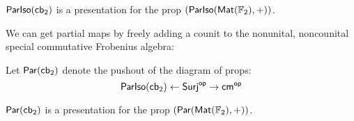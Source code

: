 \begin{remark}


\end{remark}


\begin{lemma}
\label{lem:parisocb}
$\mathsf{Par}{\sf Iso}({\sf cb}_2)$ is a presentation for the prop $(\mathsf{Par}{\sf Iso}(\mathsf{Mat}(\mathbb{F}_2),+))$.
\end{lemma}


We can get partial maps by freely adding a counit to the nonunital, noncounital special commutative Frobenius algebra:

\begin{definition}

Let $\mathsf{Par}({\sf cb}_2)$ denote the pushout of the diagram of props:
$$
\mathsf{Par}{\sf Iso}({\sf cb}_2)  \leftarrow  {\sf Surj}^{\mathsf{op}} \rightarrow   {\sf cm}^{\mathsf{op}}
$$

\end{definition}




\begin{lemma}
\label{lem:parcb}

$\mathsf{Par}({\sf cb}_2)$ is a presentation for the prop $(\mathsf{Par}(\mathsf{Mat}(\mathbb{F}_2),+))$.
\end{lemma}



